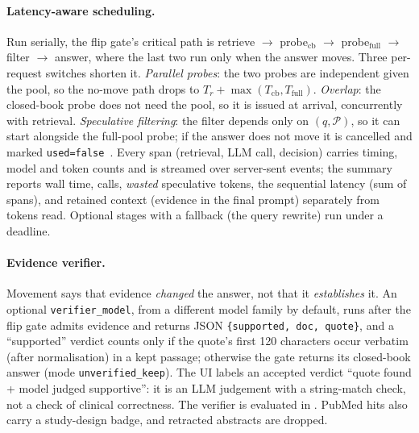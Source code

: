 \documentclass[11pt]{article}
\begin{document}
\paragraph{Latency-aware scheduling.} Run serially, the flip gate's critical path
is retrieve $\to$ probe$_{\mathrm{cb}}$ $\to$ probe$_{\mathrm{full}}$ $\to$
filter $\to$ answer, where the last two run only when the answer moves. Three
per-request switches shorten it. \emph{Parallel probes}: the two probes are
independent given the pool, so the no-move path drops to
$T_r+\max(T_{\mathrm{cb}},T_{\mathrm{full}})$. \emph{Overlap}: the closed-book
probe does not need the pool, so it is issued at arrival, concurrently with
retrieval. \emph{Speculative filtering}: the filter depends only on
$(q,\mathcal{P})$, so it can start alongside the full-pool probe; if the answer
does not move it is cancelled and marked \texttt{used=false}~\citep{specdecoding,speculativerag}. Every span
(retrieval, LLM call, decision) carries timing, model and token counts and is
streamed over server-sent events; the summary reports wall time, calls,
\emph{wasted} speculative tokens, the sequential latency (sum of spans), and
retained context (evidence in the final prompt) separately from tokens read. Optional stages
with a fallback (the query rewrite) run under a deadline.

\paragraph{Evidence verifier.} Movement says that evidence \emph{changed} the
answer, not that it \emph{establishes} it. An optional \texttt{verifier\_model},
from a different model family by default, runs after the flip gate admits
evidence and returns JSON \texttt{\{supported, doc, quote\}}, and a
``supported'' verdict counts only if the quote's first 120 characters occur
verbatim (after normalisation) in a kept passage; otherwise the gate returns its
closed-book answer (mode \texttt{unverified\_keep}). The UI labels an accepted
verdict ``quote found + model judged supportive'': it is an LLM judgement with a
string-match check, not a check of clinical correctness. The verifier is
evaluated in \citet{influence}. PubMed hits also carry a study-design badge,
and retracted abstracts are dropped.
\end{document}
